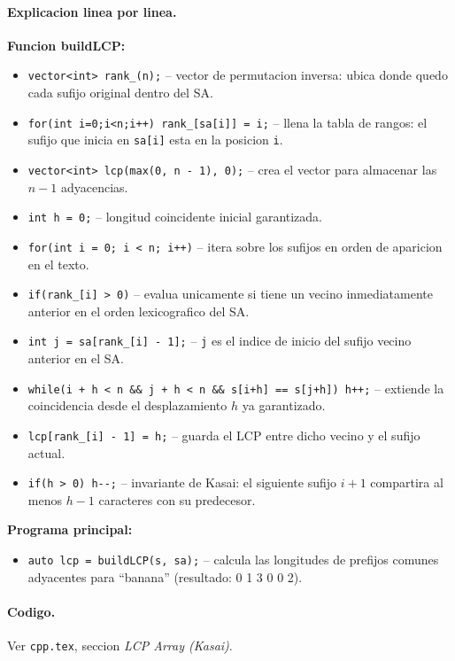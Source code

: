 \paragraph{Explicacion linea por linea.}
\textbf{Funcion buildLCP:}
\begin{itemize}\setlength\itemsep{0pt}
	\item \verb|vector<int> rank_(n);| -- vector de permutacion inversa: ubica donde quedo cada sufijo original dentro del SA.
	\item \verb|for(int i=0;i<n;i++) rank_[sa[i]] = i;| -- llena la tabla de rangos: el sufijo que inicia en \verb|sa[i]| esta en la posicion \verb|i|.
	\item \verb|vector<int> lcp(max(0, n - 1), 0);| -- crea el vector para almacenar las $n-1$ adyacencias.
	\item \verb|int h = 0;| -- longitud coincidente inicial garantizada.
	\item \verb|for(int i = 0; i < n; i++)| -- itera sobre los sufijos en orden de aparicion en el texto.
	\item \verb|if(rank_[i] > 0)| -- evalua unicamente si tiene un vecino inmediatamente anterior en el orden lexicografico del SA.
	\item \verb|int j = sa[rank_[i] - 1];| -- \verb|j| es el indice de inicio del sufijo vecino anterior en el SA.
	\item \verb|while(i + h < n && j + h < n && s[i+h] == s[j+h]) h++;| -- extiende la coincidencia desde el desplazamiento $h$ ya garantizado.
	\item \verb|lcp[rank_[i] - 1] = h;| -- guarda el LCP entre dicho vecino y el sufijo actual.
	\item \verb|if(h > 0) h--;| -- invariante de Kasai: el siguiente sufijo $i+1$ compartira al menos $h-1$ caracteres con su predecesor.
\end{itemize}
\textbf{Programa principal:}
\begin{itemize}\setlength\itemsep{0pt}
	\item \verb|auto lcp = buildLCP(s, sa);| -- calcula las longitudes de prefijos comunes adyacentes para ``banana'' (resultado: 0 1 3 0 0 2).
\end{itemize}

\paragraph{Codigo.}
Ver \texttt{cpp.tex}, seccion \textit{LCP Array (Kasai)}.

\vspace{0.5em}
